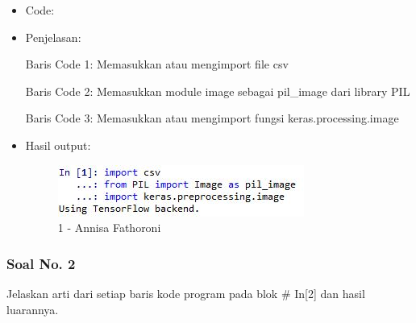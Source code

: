 \begin{itemize}
\item Code:


\item Penjelasan:

Baris Code 1: Memasukkan atau mengimport file csv

Baris Code 2: Memasukkan module image sebagai pil\_image dari library PIL

Baris Code 3: Memasukkan atau mengimport fungsi keras.processing.image 

\item Hasil output:

\begin{figure}[!hbtp]
\centering
\includegraphics[scale=0.7]{figures/Chapter 7/1164067/Praktek/Chapter7AnnisaFathoroni1.jpg}
\caption{1 - Annisa Fathoroni}
\label{1 - Annisa Fathoroni}
\end{figure}

\end{itemize}

\subsubsection{Soal No. 2}
Jelaskan arti dari setiap baris kode program pada blok \# In[2] dan hasil luarannya.

